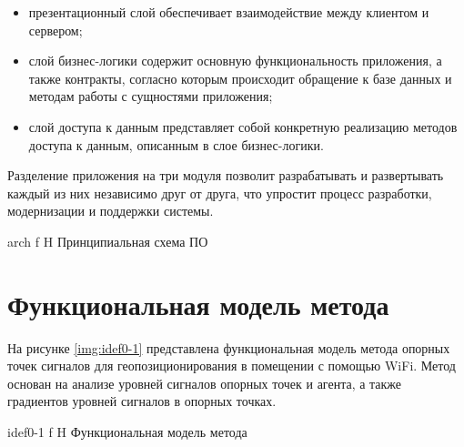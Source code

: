 \begin{itemize}[label=---]
    \item презентационный слой обеспечивает взаимодействие между клиентом и сервером;
    \item слой бизнес-логики содержит основную функциональность приложения, а также контракты, согласно которым происходит обращение к базе данных и методам работы с сущностями приложения;
    \item слой доступа к данным представляет собой конкретную реализацию методов доступа к данным, описанным в слое бизнес-логики.
\end{itemize}
Разделение приложения на три модуля позволит разрабатывать и развертывать каждый из них независимо друг от друга, что упростит процесс разработки, модернизации и поддержки системы.

    {arch}
    {f}
    {H}
    {\linewidth}
    {Принципиальная схема ПО}

\section{Функциональная модель метода}

На рисунке \ref{img:idef0-1} представлена функциональная модель метода опорных точек сигналов для геопозиционирования в помещении с помощью WiFi. Метод основан на анализе уровней сигналов опорных точек и агента, а также градиентов уровней сигналов в опорных точках.

    {idef0-1}
    {f}
    {H}
    {\linewidth}
    {Функциональная модель метода}
